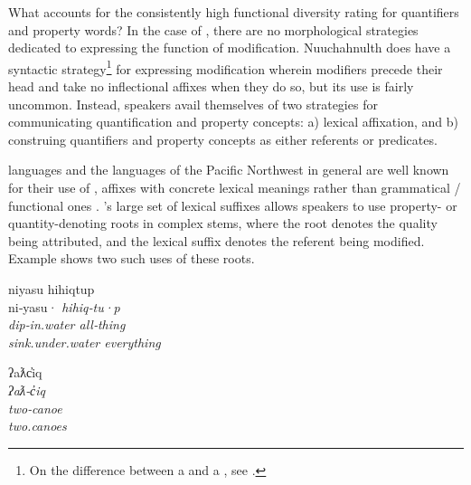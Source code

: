 What accounts for the consistently high functional diversity rating for quantifiers and property words? In the case of , there are no morphological strategies dedicated to expressing the function of modification. Nuuchahnulth does have a syntactic strategy\footnote{On the difference between a  and a , see \textcites[537]{Croft2014}[380]{Croft2016}.} for expressing modification wherein modifiers precede their head and take no inflectional affixes when they do so, but its use is fairly uncommon. Instead, speakers avail themselves of two strategies for communicating quantification and property concepts: a) lexical affixation, and b) construing quantifiers and property concepts as either referents or predicates.

 languages and the languages of the Pacific Northwest in general are well known for their use of , affixes with concrete lexical meanings rather than grammatical / functional ones \parencite{Mithun1997}. 's large set of lexical suffixes allows speakers to use property- or quantity-denoting roots in complex stems, where the root denotes the quality being attributed, and the lexical suffix denotes the referent being modified. Example  shows two such uses of these roots.

\begin{exe}
  \ex\label{ex:4.5}
  \begin{xlist}

    \ex\label{ex:4.5a}
    \gllll niyasu           hihiqtup\\
           ni‑yasu·         \em{hihiq}‑tu·p\\
           dip‑in.water     \em{all}‑thing\\
           sink.under.water everything\\

    \ex\label{ex:4.5b}
    \gllll ʔaƛc̓iq\\
           \em{ʔaƛ}‑c̓iq\\
           \em{two}‑canoe\\
           two.canoes\\

  \end{xlist}
\end{exe}

